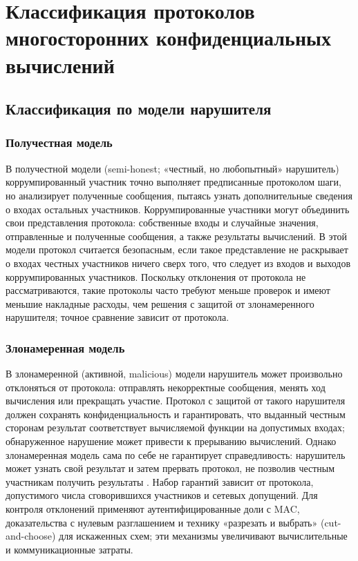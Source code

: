 \section{Классификация протоколов многосторонних конфиденциальных вычислений}
\label{sec:protocol-classification}

\subsection{Классификация по модели нарушителя}
\label{subsec:classification-threats}

\subsubsection{Получестная модель}
В получестной модели (semi-honest; «честный, но любопытный» нарушитель) коррумпированный участник точно выполняет предписанные протоколом шаги, но анализирует полученные сообщения, пытаясь узнать дополнительные сведения о входах остальных участников. Коррумпированные участники могут объединить свои представления протокола: собственные входы и случайные значения, отправленные и полученные сообщения, а также результаты вычислений. В этой модели протокол считается безопасным, если такое представление не раскрывает о входах честных участников ничего сверх того, что следует из входов и выходов коррумпированных участников. Поскольку отклонения от протокола не рассматриваются, такие протоколы часто требуют меньше проверок и имеют меньшие накладные расходы, чем решения с защитой от злонамеренного нарушителя; точное сравнение зависит от протокола.

\subsubsection{Злонамеренная модель}
В злонамеренной (активной, malicious) модели нарушитель может произвольно отклоняться от протокола: отправлять некорректные сообщения, менять ход вычисления или прекращать участие. Протокол с защитой от такого нарушителя должен сохранять конфиденциальность и гарантировать, что выданный честным сторонам результат соответствует вычисляемой функции на допустимых входах; обнаруженное нарушение может привести к прерыванию вычислений. Однако злонамеренная модель сама по себе не гарантирует справедливость: нарушитель может узнать свой результат и затем прервать протокол, не позволив честным участникам получить результаты \cite{06}. Набор гарантий зависит от протокола, допустимого числа сговорившихся участников и сетевых допущений. Для контроля отклонений применяют аутентифицированные доли с MAC, доказательства с нулевым разглашением и технику «разрезать и выбрать» (cut-and-choose) для искаженных схем; эти механизмы увеличивают вычислительные и коммуникационные затраты.

